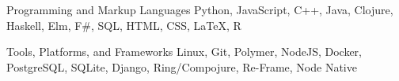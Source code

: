 

\begin{cvskills}

  \cvskill
    {Programming and Markup Languages} %
    {Python, JavaScript, C++, Java, Clojure, Haskell, Elm, F\#, SQL, HTML, CSS, LaTeX, R} %

  \cvskill
    {Tools, Platforms, and Frameworks} %
    {Linux, Git, Polymer, NodeJS, Docker, PostgreSQL, SQLite, Django, Ring/Compojure, Re-Frame, Node Native} %

\end{cvskills}

